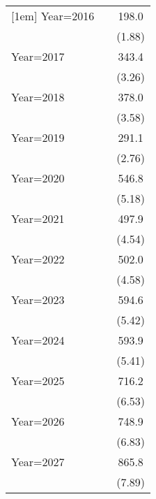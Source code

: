 {\begin{longtable}{l*{2}{c}}
[1em]
Year=2016           &                     &       198.0         \\
                    &                     &      (1.88)         \\
[1em]
Year=2017           &                     &       343.4\sym{**} \\
                    &                     &      (3.26)         \\
[1em]
Year=2018           &                     &       378.0\sym{***}\\
                    &                     &      (3.58)         \\
[1em]
Year=2019           &                     &       291.1\sym{**} \\
                    &                     &      (2.76)         \\
[1em]
Year=2020           &                     &       546.8\sym{***}\\
                    &                     &      (5.18)         \\
[1em]
Year=2021           &                     &       497.9\sym{***}\\
                    &                     &      (4.54)         \\
[1em]
Year=2022           &                     &       502.0\sym{***}\\
                    &                     &      (4.58)         \\
[1em]
Year=2023           &                     &       594.6\sym{***}\\
                    &                     &      (5.42)         \\
[1em]
Year=2024           &                     &       593.9\sym{***}\\
                    &                     &      (5.41)         \\
[1em]
Year=2025           &                     &       716.2\sym{***}\\
                    &                     &      (6.53)         \\
[1em]
Year=2026           &                     &       748.9\sym{***}\\
                    &                     &      (6.83)         \\
[1em]
Year=2027           &                     &       865.8\sym{***}\\
                    &                     &      (7.89)         \\

\end{longtable}}
